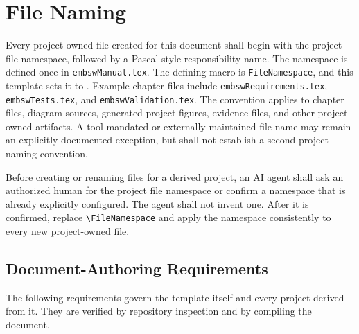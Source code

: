 \section{File Naming}

Every project-owned file created for this document shall begin with the project
file namespace, followed by a Pascal-style responsibility name. The namespace
is defined once in \texttt{embswManual.tex}. The defining macro is
\texttt{FileNamespace}, and this template sets it to
\texttt{\FileNamespace}. Example chapter files include
\texttt{embswRequirements.tex}, \texttt{embswTests.tex}, and
\texttt{embswValidation.tex}. The convention applies to chapter files, diagram
sources, generated project figures, evidence files, and other project-owned
artifacts. A tool-mandated or externally maintained file name may remain an
explicitly documented exception, but shall not establish a second project
naming convention.

Before creating or renaming files for a derived project, an AI agent shall ask
an authorized human for the project file namespace or confirm a namespace that
is already explicitly configured. The agent shall not invent one. After it is
confirmed, replace \verb|\FileNamespace| and apply the namespace consistently
to every new project-owned file.

\subsection{Document-Authoring Requirements}
The following requirements govern the template itself and every project derived
from it. They are verified by repository inspection and by compiling the
document.


